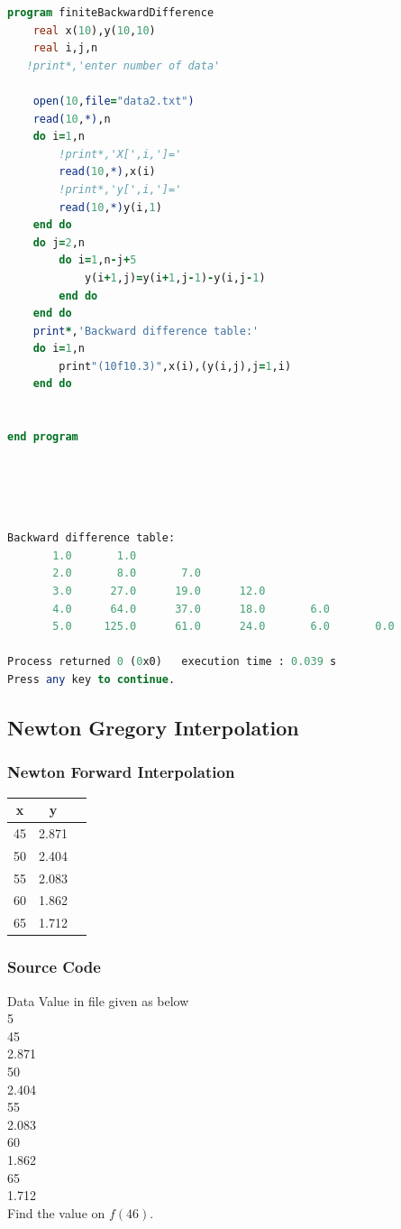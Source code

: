 \documentclass{article}
\begin{document}
\begin{lstlisting}[language=Fortran,caption=Finite Backward Difference]
program finiteBackwardDifference
    real x(10),y(10,10)
    real i,j,n
   !print*,'enter number of data'

    open(10,file="data2.txt")
    read(10,*),n
    do i=1,n
        !print*,'X[',i,']='
        read(10,*),x(i)
        !print*,'y[',i,']='
        read(10,*)y(i,1)
    end do
    do j=2,n
        do i=1,n-j+5
            y(i+1,j)=y(i+1,j-1)-y(i,j-1)
        end do
    end do
    print*,'Backward difference table:'
    do i=1,n
        print"(10f10.3)",x(i),(y(i,j),j=1,i)
    end do


end program






\end{lstlisting}
\begin{lstlisting}[language=Fortran,caption=Finite Backward Difference Output]
 Backward difference table:
       1.0       1.0
       2.0       8.0       7.0
       3.0      27.0      19.0      12.0
       4.0      64.0      37.0      18.0       6.0
       5.0     125.0      61.0      24.0       6.0       0.0

Process returned 0 (0x0)   execution time : 0.039 s
Press any key to continue.
\end{lstlisting}
\subsection{Newton Gregory Interpolation}
\subsubsection{Newton Forward Interpolation}
\begin{center}
\begin{tabular}{ |c|c|c| } 
\hline
 x & y\\
 \hline
 45 & 2.871  \\  \hline
 50 & 2.404  \\  \hline
 55 & 2.083 \\  \hline
 60 & 1.862  \\  \hline
 65 & 1.712 \\  \hline
 
 \hline
\end{tabular}
\end{center}
\subsubsection{Source Code}
Data Value in file given as below\\
5\\
45\\
2.871\\
50\\
2.404\\
55\\
2.083\\
60\\
1.862\\
65\\
1.712\\
Find the value on $f(46)$.
\end{document}
